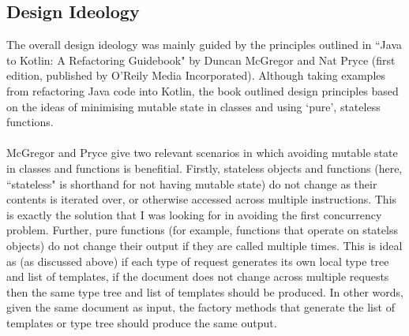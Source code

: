 \documentclass[../main.tex]{subfiles}
\begin{document}
\subsection{Design Ideology}
The overall design ideology was mainly guided by the principles outlined in ``Java to Kotlin: A Refactoring Guidebook" by Duncan McGregor and Nat Pryce (first edition, published by O'Reily Media Incorporated). Although taking examples from refactoring Java code into Kotlin, the book outlined design principles based on the ideas of minimising mutable state in classes and using `pure', stateless functions. 
\\
\\
McGregor and Pryce give two relevant scenarios in which avoiding mutable state in classes and functions is benefitial. Firstly, stateless objects and functions (here, ``stateless" is shorthand for not having mutable state) do not change as their contents is iterated over, or otherwise accessed across multiple instructions. \cite{java_to_kotlin_stateless} This is exactly the solution that I was looking for in avoiding the first concurrency problem. Further, pure functions (for example, functions that operate on statelss objects) do not change their output if they are called multiple times\cite{java_to_kotlin_pure_functions}. This is ideal as (as discussed above) if each type of request generates its own local type tree and list of templates, if the document does not change across multiple requests then the same type tree and list of templates should be produced. In other words, given the same document as input, the factory methods that generate the list of templates or type tree should produce the same output. 
\end{document}

